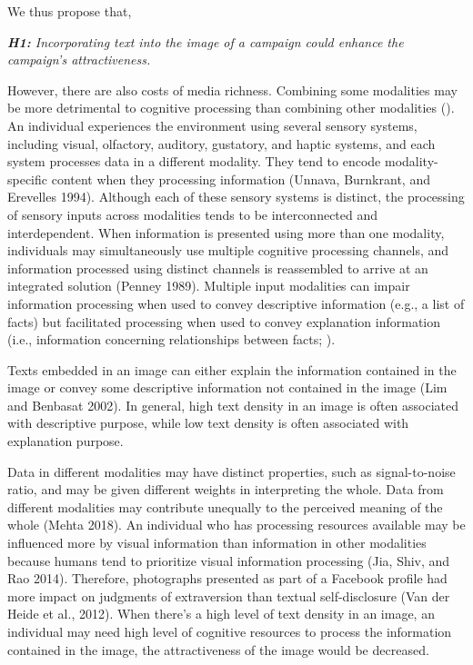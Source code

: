 \documentclass[a4paper]{article}
\begin{document}
We thus propose that, 


\textit{\textbf{H1:} Incorporating text into the image of a campaign could enhance the campaign's attractiveness.  }



However, there are also costs of media richness. Combining some modalities may be more detrimental to cognitive processing than combining other modalities (\cite{tavassoli_differential_2003}). An individual experiences the environment using several sensory systems, including visual, olfactory, auditory, gustatory, and haptic systems, and each system processes data in a different modality. They tend to encode modality-specific content when they processing information (Unnava, Burnkrant, and Erevelles 1994). Although each of these sensory systems is distinct, the processing of sensory inputs across modalities tends to be interconnected and interdependent. When information is presented using more than one modality, individuals may simultaneously use multiple cognitive processing channels, and information processed using distinct channels is reassembled to arrive at an integrated solution (Penney 1989).  Multiple input modalities can impair information processing when used to convey descriptive information (e.g., a list of facts) but facilitated processing when used to convey explanation information (i.e., information concerning relationships between facts; \cite{lim_influence_2002}). 

Texts embedded in an image can either explain the information contained in the image or convey some descriptive information not contained in the image (Lim and Benbasat 2002). In general, high text density in an image is often associated with descriptive purpose, while low text density is often associated with explanation purpose. 

Data in different modalities may have distinct properties, such as signal-to-noise ratio, and may be given different weights in interpreting the whole. Data from different modalities may contribute unequally to the perceived meaning of the whole (Mehta 2018). An individual who has processing resources available may be influenced more by visual information than information in other modalities because humans tend to prioritize visual information processing (Jia, Shiv, and Rao 2014). Therefore, photographs presented as part of a Facebook profile had more impact on judgments of extraversion than textual self-disclosure (Van der Heide et al., 2012). When there's a high level of text density in an image, an individual may need high level of cognitive resources to process the information contained in the image, the attractiveness of the image would be decreased. 
\end{document}
